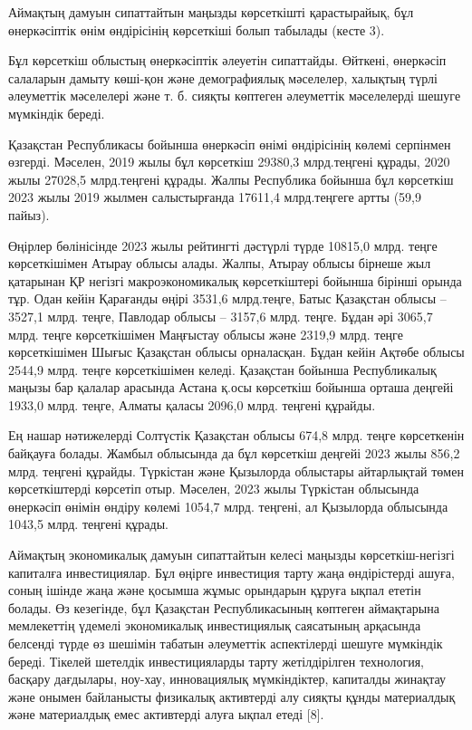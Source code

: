 \begin{multicols}{2}
Аймақтың дамуын сипаттайтын маңызды көрсеткішті қарастырайық, бұл
өнеркәсіптік өнім өндірісінің көрсеткіші болып табылады (кесте 3).

Бұл көрсеткіш облыстың өнеркәсіптік әлеуетін сипаттайды. Өйткені,
өнеркәсіп салаларын дамыту көші-қон және демографиялық мәселелер,
халықтың түрлі әлеуметтік мәселелері және т. б. сияқты көптеген
әлеуметтік мәселелерді шешуге мүмкіндік береді.

Қазақстан Республикасы бойынша өнеркәсіп өнімі өндірісінің көлемі
серпінмен өзгерді. Мәселен, 2019 жылы бұл көрсеткіш 29380,3 млрд.теңгені
құрады, 2020 жылы 27028,5 млрд.теңгені құрады. Жалпы Республика бойынша
бұл көрсеткіш 2023 жылы 2019 жылмен салыстырғанда 17611,4 млрд.теңгеге
артты (59,9 пайыз).

Өңірлер бөлінісінде 2023 жылы рейтингті дәстүрлі түрде 10815,0 млрд.
теңге көрсеткішімен Атырау облысы алады. Жалпы, Атырау облысы бірнеше
жыл қатарынан ҚР негізгі макроэкономикалық көрсеткіштері бойынша бірінші
орында тұр. Одан кейін Қарағанды өңірі 3531,6 млрд.теңге, Батыс
Қазақстан облысы -- 3527,1 млрд. теңге, Павлодар облысы -- 3157,6 млрд.
теңге. Бұдан әрі 3065,7 млрд. теңге көрсеткішімен Маңғыстау облысы және
2319,9 млрд. теңге көрсеткішімен Шығыс Қазақстан облысы орналасқан.
Бұдан кейін Ақтөбе облысы 2544,9 млрд. теңге көрсеткішімен келеді.
Қазақстан бойынша Республикалық маңызы бар қалалар арасында Астана қ.осы
көрсеткіш бойынша орташа деңгейі 1933,0 млрд. теңге, Алматы қаласы
2096,0 млрд. теңгені құрайды.

Ең нашар нәтижелерді Солтүстік Қазақстан облысы 674,8 млрд. теңге
көрсеткенін байқауға болады. Жамбыл облысында да бұл көрсеткіш деңгейі
2023 жылы 856,2 млрд. теңгені құрайды. Түркістан және Қызылорда
облыстары айтарлықтай төмен көрсеткіштерді көрсетіп отыр. Мәселен, 2023
жылы Түркістан облысында өнеркәсіп өнімін өндіру көлемі 1054,7 млрд.
теңгені, ал Қызылорда облысында 1043,5 млрд. теңгені құрады.

Аймақтың экономикалық дамуын сипаттайтын келесі маңызды
көрсеткіш-негізгі капиталға инвестициялар. Бұл өңірге инвестиция тарту
жаңа өндірістерді ашуға, соның ішінде жаңа және қосымша жұмыс орындарын
құруға ықпал ететін болады. Өз кезегінде, бұл Қазақстан Республикасының
көптеген аймақтарына мемлекеттің үдемелі экономикалық инвестициялық
саясатының арқасында белсенді түрде өз шешімін табатын әлеуметтік
аспектілерді шешуге мүмкіндік береді. Тікелей шетелдік инвестицияларды
тарту жетілдірілген технология, басқару дағдылары, ноу-хау, инновациялық
мүмкіндіктер, капиталды жинақтау және онымен байланысты физикалық
активтерді алу сияқты құнды материалдық және материалдық емес активтерді
алуға ықпал етеді {[}8{]}.
\end{multicols}


